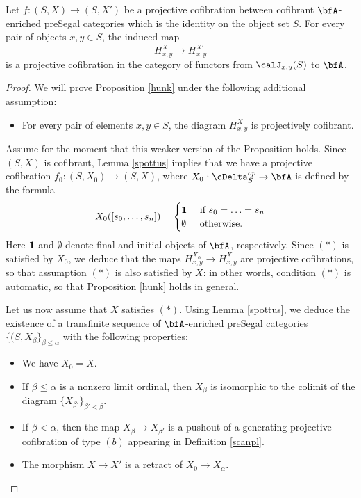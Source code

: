 \begin{proposition}\label{hunk}
Let $f: (S, X) \rightarrow (S, X')$ be a projective cofibration between cofibrant $\bfA$-enriched preSegal categories
which is the identity on the object set $S$. For every pair of objects $x,y \in S$, the induced map
$$ H^{X}_{x,y} \rightarrow H^{X'}_{x,y}$$ 
is a projective cofibration in the category of functors from $\calJ_{x,y}(S)$ to $\bfA$.
\end{proposition}

\begin{proof}
We will prove Proposition \ref{hunk} under the following additional assumption:
\begin{itemize}
\item[$(\ast)$] For every pair of elements $x,y \in S$, the diagram
$H^{X}_{x,y}$ is projectively cofibrant.
\end{itemize}
Assume for the moment that this weaker version of the Proposition holds. Since $(S,X)$ is cofibrant, Lemma \ref{spottus} implies that we have a projective cofibration $f_0: (S, X_0) \rightarrow (S,X)$, where
$X_0: \cDelta^{op}_{S} \rightarrow \bfA$ is defined by the formula
$$ X_0( [s_0, \ldots, s_n]) = \begin{cases} {\bf 1} & \text{ if } s_0 = \ldots = s_n \\
\emptyset & \text{ otherwise.} \end{cases}$$
Here ${\bf 1}$ and $\emptyset$ denote final and initial objects of $\bfA$, respectively.
Since $(\ast)$ is satisfied by $X_0$, we deduce that the maps
$H^{X_0}_{x,y} \rightarrow H^{X}_{x,y}$ are projective cofibrations, so that
assumption $(\ast)$ is also satisfied by $X$: in other words, condition $(\ast)$ is automatic, so that Proposition \ref{hunk} holds in general.

Let us now assume that $X$ satisfies $(\ast)$. Using Lemma \ref{spottus}, we deduce the existence of
a transfinite sequence of $\bfA$-enriched preSegal categories $\{ (S, X_{\beta} \}_{ \beta \leq \alpha}$
with the following properties:
\begin{itemize}
\item We have $X_0 = X$.
\item If $\beta \leq \alpha$ is a nonzero limit ordinal, then $X_{\beta}$ is isomorphic to the colimit of the diagram $\{ X_{\beta'} \}_{ \beta' < \beta}$.
\item If $\beta < \alpha$, then the map $X_{\beta} \rightarrow X_{\beta'}$ is a pushout of a generating projective cofibration of type $(b)$ appearing in Definition \ref{scanpl}.
\item The morphism $X \rightarrow X'$ is a retract of $X_0 \rightarrow X_{\alpha}$.
\end{itemize}


\end{proof}
